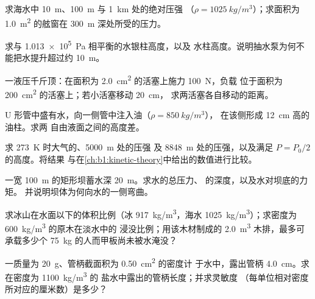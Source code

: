 \begin{exercise}[$\star$]\label{exo:b1:fluid-statics:1}
求海水中 \qty{10}{m}、\qty{100}{m} 与 \qty{1}{km} 处的绝对压强
（$\rho = \qty{1025}{kg/m^3}$）；求面积为 \qty{1.0}{m^2}
的舷窗在 \qty{300}{m} 深处所受的压力。
\end{exercise}

\begin{exercise}[$\star$]\label{exo:b1:fluid-statics:2}
求与 \qty{1.013e5}{Pa} 相平衡的水银柱高度，以及
水柱高度。说明抽水泵为何不能把水提升超过约 \qty{10}{m}。
\end{exercise}

\begin{exercise}[$\star$]\label{exo:b1:fluid-statics:3}
一液压千斤顶：在面积为 \qty{2.0}{cm^2} 的活塞上施力 \qty{100}{N}，负载
位于面积为 \qty{200}{cm^2} 的活塞上；若小活塞移动 \qty{20}{cm}，
求两活塞各自移动的距离。
\end{exercise}

\begin{exercise}[$\star$]\label{exo:b1:fluid-statics:4}
U 形管中盛有水，向一侧管中注入油（$\rho = \qty{850}{kg/m^3}$），
在该侧形成 \qty{12}{cm} 高的油柱。求两
自由液面之间的高度差。
\end{exercise}

\begin{exercise}[$\star\star$]\label{exo:b1:fluid-statics:5}
求 \qty{273}{K} 时大气的、\qty{5000}{m} 处的压强
及 \qty{8848}{m} 处的压强，以及满足 $P = P_0/2$ 的高度。将结果
与在\cref{ch:b1:kinetic-theory}中给出的数值进行比较。
\end{exercise}

\begin{exercise}[$\star\star$]\label{exo:b1:fluid-statics:6}
一宽 \qty{100}{m} 的矩形坝蓄水深 \qty{20}{m}。求水的总压力、
的深度，以及水对坝底的力矩。
并说明坝体为何向水的一侧弯曲。
\end{exercise}

\begin{exercise}[$\star\star$]\label{exo:b1:fluid-statics:7}
求冰山在水面以下的体积比例（冰 \qty{917}{kg/m^3}，海水
\qty{1025}{kg/m^3}）；求密度为 \qty{600}{kg/m^3} 的原木在淡水中的
浸没比例；用该木材制成的 \qty{2.0}{m^3} 木排，最多可承载多少个
\qty{75}{kg} 的人而甲板尚未被水淹没？
\end{exercise}

\begin{exercise}[$\star\star$]\label{exo:b1:fluid-statics:8}
一质量为 \qty{20}{g}、管柄截面积为 \qty{0.50}{cm^2} 的密度计
于水中，露出管柄 \qty{4.0}{cm}。求在密度为 \qty{1100}{kg/m^3} 的
盐水中露出的管柄长度；并求灵敏度
（每单位相对密度所对应的厘米数）是多少？
\end{exercise}

